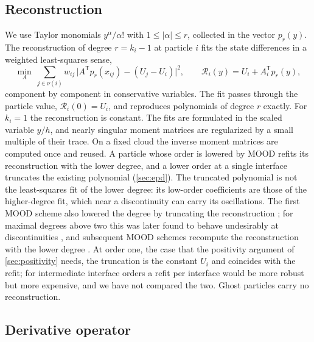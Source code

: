 \documentclass[11pt,a4paper]{article}
\numberwithin{equation}{section}
\newcommand{\nb}{\nu}
\begin{document}
\subsection{Reconstruction}\label{sec:recfit}

We use Taylor monomials $y^\alpha/\alpha!$ with $1\le|\alpha|\le r$, collected in the vector $p_r(y)$. The reconstruction of degree $r=k_i-1$ at particle $i$ fits the state differences in a weighted least-squares sense,
\begin{equation}\label{eq:recfit}
\min_{A}\ \sum_{j\in\nb(i)} w_{ij}\,\big| A^{\mathsf T}p_r(x_{ij}) - (U_j - U_i)\big|^2 ,\qquad
\mathcal{R}_i(y) = U_i + A_i^{\mathsf T}p_r(y),
\end{equation}
component by component in conservative variables. The fit passes through the particle value, $\mathcal{R}_i(0)=U_i$, and reproduces polynomials of degree $r$ exactly. For $k_i=1$ the reconstruction is constant. The fits are formulated in the scaled variable $y/h$, and nearly singular moment matrices are regularized by a small multiple of their trace. On a fixed cloud the inverse moment matrices are computed once and reused. A particle whose order is lowered by MOOD refits its reconstruction with the lower degree, and a lower order at a single interface truncates the existing polynomial (\cref{sec:epd}). The truncated polynomial is not the least-squares fit of the lower degree: its low-order coefficients are those of the higher-degree fit, which near a discontinuity can carry its oscillations. The first MOOD scheme also lowered the degree by truncating the reconstruction \cite{Clain2011}; for maximal degrees above two this was later found to behave undesirably at discontinuities \cite[Remark~4]{Diot2012}, and subsequent MOOD schemes recompute the reconstruction with the lower degree \cite{Diot2013,Loubere2014}. At order one, the case that the positivity argument of \cref{sec:positivity} needs, the truncation is the constant $U_i$ and coincides with the refit; for intermediate interface orders a refit per interface would be more robust but more expensive, and we have not compared the two. Ghost particles carry no reconstruction.

\subsection{Derivative operator}\label{sec:divfit}
\end{document}
